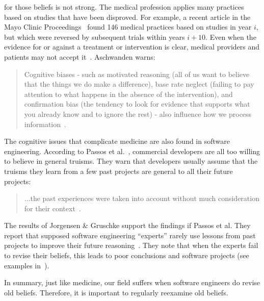 \documentclass{sig-alternate}
\begin{document}
for those beliefs is not strong.
The medical profession applies  many practices based on studies
that have been disproved. For example,
a  recent article
in the Mayo Clinic Proceedings~\cite{prasad13} found  
146 medical practices based on studies 
in year $i$, but which were  reversed by subsequent trials within years $i+10$.
Even when the evidence for or against a treatment or intervention is clear, medical providers and patients may not accept it~\cite{aschwanden10}.
Aschwanden warns:
\begin{quote}
Cognitive biases - such as motivated reasoning (all of us want to believe that the things we do make a difference), base rate neglect (failing to pay attention to what happens in the absence of the intervention), and confirmation bias (the tendency to look for evidence that supports what you already know and to ignore the rest) - also influence how we process information~\cite{aschwanden15}.
\end{quote}

The cognitive issues that complicate medicine are also found in software engineering.
According to Passos et al.~\cite{passos11}, commercial developers
are all too willing to believe in general
truisms.
They  warn that developers
usually assume that the truisms they learn from a few past
projects are general to 
all their future projects:
\begin{quote}\label{q:pass}
...the past experiences were taken into account without 
much consideration for their context~\cite{passos11}.  
\end{quote}
The results of Jorgensen \& Gruschke support the findings if Passos et al. They report that 
  supposed software engineering    ``experts'' rarely use lessons
  from past projects to improve their future reasoning~\cite{jorgensen09}. 
 They note that
when the experts
  fail to revise their beliefs, this leads to poor
 conclusions and software projects  (see examples in~\cite{jorgensen09}).

In summary, just like medicine, our field suffers when
 software engineers do  revise old beliefs.  Therefore, it is important
 to regularly  reexamine    old beliefs.
\end{document}

